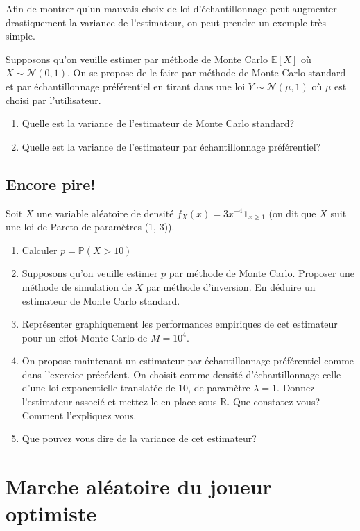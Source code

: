 \documentclass[]{article}
\begin{document}
Afin de montrer qu'un mauvais choix de loi d'échantillonnage peut
augmenter drastiquement la variance de l'estimateur, on peut prendre un
exemple très simple.

Supposons qu'on veuille estimer par méthode de Monte Carlo
\(\mathbb{E}[X]\) où \(X \sim \mathcal{N}(0, 1)\). On se propose de le
faire par méthode de Monte Carlo standard et par échantillonnage
préférentiel en tirant dans une loi \(Y \sim\mathcal{N}(\mu, 1)\) où
\(\mu\) est choisi par l'utilisateur.

\begin{enumerate}
\def\labelenumi{\arabic{enumi}.}
\item
  Quelle est la variance de l'estimateur de Monte Carlo standard?
\item
  Quelle est la variance de l'estimateur par échantillonnage
  préférentiel?
\end{enumerate}

\hypertarget{encore-pire}{%
\subsection{Encore pire!}\label{encore-pire}}

Soit \(X\) une variable aléatoire de densité
\(f_X(x) = 3x^{-4}\mathbf{1}_{x\geq 1}\) (on dit que \(X\) suit une loi
de Pareto de paramètres (1, 3)).

\begin{enumerate}
\def\labelenumi{\arabic{enumi}.}
\item
  Calculer \(p = \mathbb{P}(X>10)\)
\item
  Supposons qu'on veuille estimer \(p\) par méthode de Monte Carlo.
  Proposer une méthode de simulation de \(X\) par méthode d'inversion.
  En déduire un estimateur de Monte Carlo standard.
\item
  Représenter graphiquement les performances empiriques de cet
  estimateur pour un effot Monte Carlo de \(M= 10^4\).
\item
  On propose maintenant un estimateur par échantillonnage préférentiel
  comme dans l'exercice précédent. On choisit comme densité
  d'échantillonnage celle d'une loi exponentielle translatée de 10, de
  paramètre \(\lambda = 1\). Donnez l'estimateur associé et mettez le en
  place sous R. Que constatez vous? Comment l'expliquez vous.
\item
  Que pouvez vous dire de la variance de cet estimateur?
\end{enumerate}

\hypertarget{marche-aluxe9atoire-du-joueur-optimiste}{%
\section{Marche aléatoire du joueur
optimiste}\label{marche-aluxe9atoire-du-joueur-optimiste}}
\end{document}
